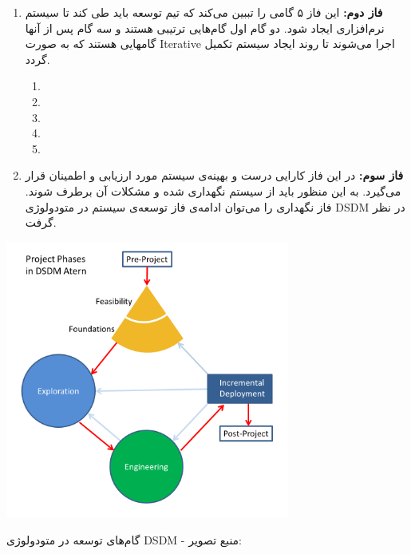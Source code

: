 \begin{enumerate}[i]
\begin{enumerate}[I]
\item \textbf{فاز دوم:‌} \newline
این فاز ۵ گامی را تببین می‌کند که تیم توسعه باید طی کند تا سیستم نرم‌افزاری ایجاد شود. دو گام اول گام‌هایی ترتیبی هستند و سه گام پس از آنها گامهایی هستند که به صورت Iterative اجرا می‌شوند تا روند ایجاد سیستم تکمیل گردد.

\begin{enumerate}[1]
\item {}
\item {}
\item {}
\item {}
\item {}
\end{enumerate}

\item \textbf{فاز سوم:‌} \newline
در این فاز کارایی درست و بهینه‌ی سیستم مورد ارزیابی و اطمینان قرار می‌گیرد. به این منظور باید از سیستم نگهداری شده و مشکلات آن برطرف شوند. فاز نگهداری را می‌توان ادامه‌ی فاز توسعه‌ی سیستم در متودولوژی DSDM در نظر گرفت.
\cite{dsdm-stages}
\end{enumerate}

\begin{center}
\includegraphics[width = 0.7\textwidth]{images/DSDM_Atern_Project_Phases}

گام‌های توسعه در متودولوژی DSDM - منبع تصویر:
\end{center}


\end{enumerate}
